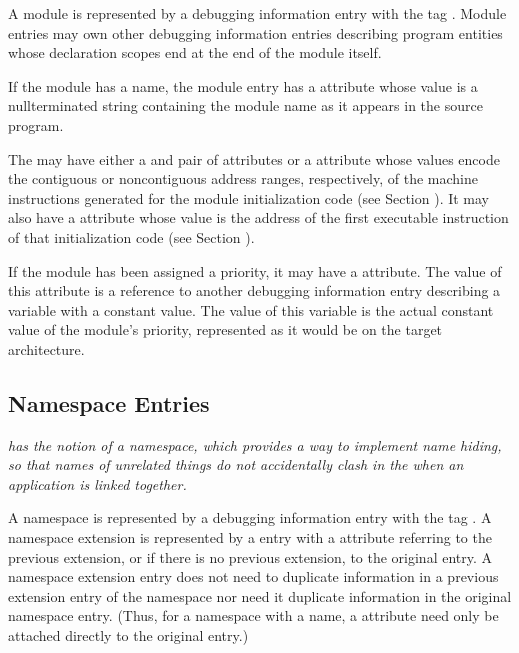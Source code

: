 A module is represented by a debugging information entry
with the 
tag \DWTAGmoduleTARG.  
Module entries may own other
debugging information entries describing program entities
whose declaration scopes end at the end of the module itself.

If the module has a name, the module entry has a 
\DWATname{} attribute 
whose value is a null\dash terminated string containing
the module name as it appears in the source program.

The  may have either a 
\DWATlowpc{} and
\DWAThighpc{} 
pair 
of 
attributes or a 
\DWATranges{} attribute
whose values encode the contiguous or non\dash contiguous address
ranges, respectively, of the machine instructions generated for
the module initialization code 
(see Section ). 
\hypertarget{chap:DWATentrypcentryaddressofmoduleinitialization}{}
It may also
have a 
\DWATentrypc{} attribute whose value is the address of
the first executable instruction of that initialization code
(see Section ).

If 
\hypertarget{chap:DWATprioritymodulepriority}{}
the module has been assigned a priority, it may have a
\DWATpriorityDEFN{} attribute. 
The value of this attribute is a
reference to another debugging information entry describing
a variable with a constant value. The value of this variable
is the actual constant value of the module\textquoteright s priority,
represented as it would be on the target architecture.

\subsection{Namespace Entries}
\label{chap:namespaceentries}
\textit{ has the notion of a namespace, which provides a way to
implement name hiding, so that names of unrelated things
do not accidentally clash in the 
 when an
application is linked together.}

A namespace is represented by a debugging information entry
with the 
tag \DWTAGnamespaceTARG. 
A namespace extension is
\hypertarget{chap:DWATextensionpreviousnamespaceextensionororiginalnamespace}{}
represented by a 
\DWTAGnamespaceNAME{} entry 
with 
a 
\DWATextensionDEFN{}
attribute referring to the previous extension, or if there
is no previous extension, to the original 
\DWTAGnamespaceNAME{}
entry. A namespace extension entry does not need to duplicate
information in a previous extension entry of the namespace
nor need it duplicate information in the original namespace
entry. (Thus, for a namespace with a name, 
a \DWATname{} attribute 
need only be attached directly to the original
\DWTAGnamespaceNAME{} entry.)

